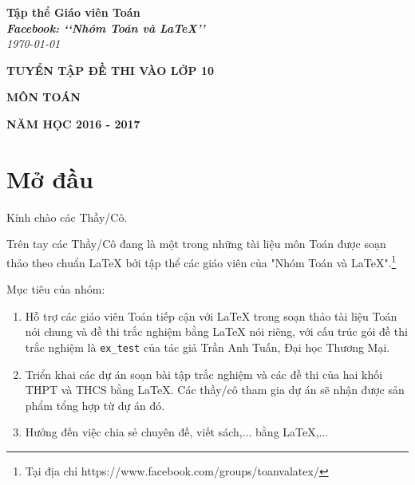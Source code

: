 \documentclass[12pt,a4paper]{book}
\renewcommand{\baselinestretch}{1.4}
\begin{document}
\providecommand*{\dx}{\ensuremath{\mathrm{\,d}}x}
\providecommand*{\unit}[1]{\ensuremath{\mathrm{\,#1}}}

\begin{titlepage}
\begin{flushright}
\fontsize{17}{0}\selectfont
\textbf{Tập thể Giáo viên Toán}\\
\textbf{\textit{Facebook: \lq\lq Nhóm Toán và LaTeX\rq\rq}}\\
\textit{\color{red}\today}
\end{flushright}

\vspace{4cm}

\begin{flushright}

\vspace{1cm}

 \textbf{\fontsize{30}{0}\selectfont T\fontsize{20}{0}\selectfont UYỂN TẬP ĐỀ THI VÀO LỚP 10}
 
 \vspace{1cm}
 
 \textbf{\fontsize{35}{0}\selectfont MÔN TOÁN}
\end{flushright}

\vfill{
\begin{flushright}
\fontsize{17}{0}\textbf{NĂM HỌC 2016 - 2017}
\end{flushright}
}
\end{titlepage}
\pagestyle{empty}
\renewcommand{\headrulewidth}{0.4pt}

{\renewcommand{\baselinestretch}{1.3}
\tableofcontents
}

\pagestyle{fancy}
\lhead{\empty}
\rhead{\empty}
\lfoot{\currfilename}
\chapter*{Mở đầu}
Kính chào các Thầy/Cô.

\vspace{0.6cm}

\noindent Trên tay các Thầy/Cô đang là một trong những tài liệu môn Toán được soạn thảo theo chuẩn \LaTeX{} bởi tập thể các giáo viên của "Nhóm Toán và LaTeX".\footnote{Tại địa chỉ https://www.facebook.com/groups/toanvalatex/}

\vspace{0.6cm}

\noindent Mục tiêu của nhóm: 
\begin{enumerate}
\item Hỗ trợ các giáo viên Toán tiếp cận với \LaTeX{} trong soạn thảo tài liệu Toán nói chung và đề thi trắc nghiệm bằng \LaTeX{} nói riêng, với cấu trúc gói đề thi trắc nghiệm là \texttt{ex\_test} của tác giả Trần Anh Tuấn, Đại học Thương Mại.
\item Triển khai các dự án soạn bài tập trắc nghiệm và các đề thi của hai khối THPT và THCS bằng \LaTeX{}. Các thầy/cô tham gia dự án sẽ nhận được sản phẩm tổng hợp từ dự án đó.
\item Hướng đến việc chia sẻ chuyên đề, viết sách,... bằng \LaTeX,...
\end{enumerate}
\end{document}
